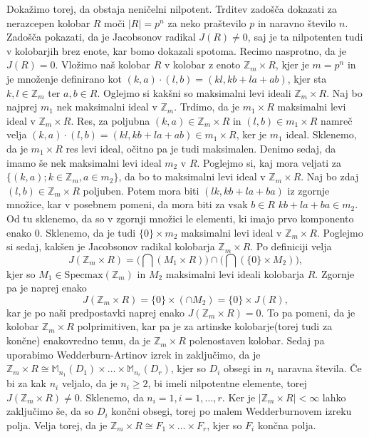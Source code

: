 \documentclass[a4paper, 12pt]{amsart}
\theoremstyle{definition} %
\theoremstyle{plain} %
\newcommand{\Z}{\mathbb Z}
\newcommand{\M}{\mathbb M}
\begin{document}
Dokažimo torej, da obstaja neničelni nilpotent. Trditev zadošča dokazati za nerazcepen kolobar $R$ moči $|R|=p^n$ za neko praštevilo $p$ in naravno število $n$. Zadošča pokazati, da je Jacobsonov radikal $J(R)\neq 0$, saj je ta nilpotenten tudi v kolobarjih brez enote, kar bomo dokazali spotoma. Recimo nasprotno, da je $J(R) = 0$. Vložimo naš kolobar $R$ v kolobar z enoto $\Z_m \times R$, kjer je $m=p^n$ in je množenje definirano kot $(k,a)\cdot (l,b) = (kl,kb+la+ab)$, kjer sta $k,l\in \Z_m$ ter $a,b\in R$. Oglejmo si kakšni so maksimalni levi ideali $\Z_m \times R$. Naj bo najprej $m_1$ nek maksimalni ideal v $\Z_m$. Trdimo, da je $m_1\times R$ maksimalni levi ideal v $\Z_m \times R$. Res, za poljubna $(k,a)\in \Z_m \times R$ in $(l,b)\in m_1 \times R$ namreč velja $(k,a)\cdot (l,b) = (kl, kb+ la+ab)\in m_1 \times R$, ker je $m_1$ ideal. Sklenemo, da je $m_1\times R$ res levi ideal, očitno pa je tudi maksimalen. Denimo sedaj, da imamo še nek maksimalni levi ideal $m_2$ v $R$. Poglejmo si, kaj mora veljati za $\{(k,a); k\in \Z_m, a\in m_2\}$, da bo to maksimalni levi ideal v $\Z_m\times R$. Naj bo zdaj $(l,b)\in \Z_m \times R$ poljuben. Potem mora biti $(lk, kb+la+ba)$ iz zgornje množice, kar v posebnem pomeni, da mora biti za vsak $b\in R$ $kb+la+ba\in m_2$. Od tu sklenemo, da so v zgornji množici le elementi, ki imajo prvo komponento enako 0. Sklenemo, da je tudi $\{0\}\times m_2$ maksimalni levi ideal v $\Z_m \times R$. Poglejmo si sedaj, kakšen je Jacobsonov radikal kolobarja $\Z_m\times R$. Po definiciji velja
$$
J(\Z_m\times R) = \big(\bigcap (M_1\times R)\big) \cap\big (\bigcap (\{0\}\times M_2)\big),
$$
kjer so $M_1\in \text{Specmax}(\Z_m)$ in $M_2$ maksimalni levi ideali kolobarja $R$. Zgornje pa je naprej enako
$$
J(\Z_m \times R) = \{0\}\times (\cap M_2) = \{0 \} \times J(R),
$$
kar je po naši predpostavki naprej enako $J(\Z_m\times R) = 0$. To pa pomeni, da je kolobar $\Z_m\times R$ polprimitiven, kar pa je za artinske kolobarje(torej tudi za končne) enakovredno temu, da je $\Z_m \times R$ polenostaven kolobar. Sedaj pa uporabimo Wedderburn-Artinov izrek in zaključimo, da je $\Z_m \times R \cong \M_{n_1} (D_1)\times \dots \times\M_{n_r}(D_r)$, kjer so $D_i$ obsegi in $n_i$ naravna števila. Če bi za kak $n_i$ veljalo, da je $n_i\ge 2$, bi imeli nilpotentne elemente, torej $J(\Z_m\times R) \neq 0$. Sklenemo, da $n_i = 1, i=1,\dots,r$. Ker je $|\Z_m\times R|<\infty$ lahko zaključimo še, da so $D_i$ končni obsegi, torej po malem Wedderburnovem izreku polja. Velja torej, da je $\Z_m \times R \cong F_1 \times \dots \times F_r$, kjer so $F_i$ končna polja. 
\end{document}
